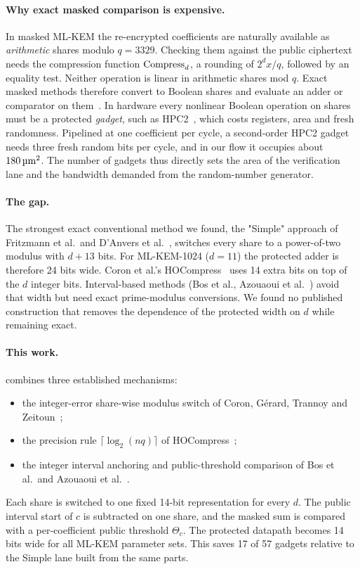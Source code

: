 \paragraph{Why exact masked comparison is expensive.}
In masked ML-KEM the re-encrypted coefficients are naturally available as \emph{arithmetic} shares modulo $q = 3329$. Checking them against the public ciphertext needs the compression function $\operatorname{Compress}_d$, a rounding of $2^d x/q$, followed by an equality test. Neither operation is linear in arithmetic shares mod $q$. Exact masked methods therefore convert to Boolean shares and evaluate an adder or comparator on them~\cite{bos2021masking,fritzmann2022,danvers2023,coron2023poly}. In hardware every nonlinear Boolean operation on shares must be a protected \emph{gadget}, such as HPC2~\cite{cassiers2021hpc}, which costs registers, area and fresh randomness. Pipelined at one coefficient per cycle, a second-order HPC2 gadget needs three fresh random bits per cycle, and in our flow it occupies about $180\,\si{\micro\meter\squared}$. The number of gadgets thus directly sets the area of the verification lane and the bandwidth demanded from the random-number generator.

\paragraph{The gap.}
The strongest exact conventional method we found, the "Simple" approach of Fritzmann et al.\ and D'Anvers et al.~\cite{fritzmann2022,danvers2023}, switches every share to a power-of-two modulus with $d + 13$ bits. For ML-KEM-1024 ($d = 11$) the protected adder is therefore 24 bits wide. Coron et al.'s HOCompress~\cite{coron2023poly} uses 14 extra bits on top of the $d$ integer bits. Interval-based methods (Bos et al., Azouaoui et al.~\cite{bos2021masking,azouaoui2023}) avoid that width but need exact prime-modulus conversions. We found no published construction that removes the dependence of the protected width on $d$ while remaining exact.

\paragraph{This work.}
\PAMS{} combines three established mechanisms:
\begin{itemize}
  \item the integer-error share-wise modulus switch of Coron, G\'erard, Trannoy and Zeitoun~\cite{coron2023dil};
  \item the precision rule $\lceil \log_2(nq) \rceil$ of HOCompress~\cite{coron2023poly};
  \item the integer interval anchoring and public-threshold comparison of Bos et al.\ and Azouaoui et al.~\cite{bos2021masking,azouaoui2023}.
\end{itemize}
Each share is switched to one fixed 14-bit representation for every $d$. The public interval start of $c$ is subtracted on one share, and the masked sum is compared with a per-coefficient public threshold $\Theta_c$. The protected datapath becomes 14 bits wide for all ML-KEM parameter sets. This saves 17 of 57 gadgets relative to the Simple lane built from the same parts.


